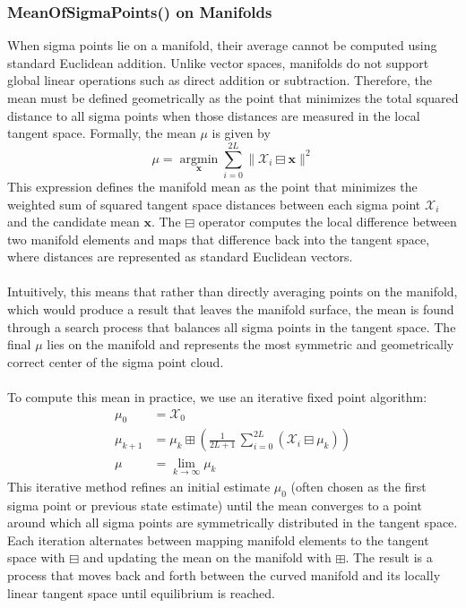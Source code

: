\subsubsection{MeanOfSigmaPoints() on Manifolds}
When sigma points lie on a manifold, their average cannot be computed using standard Euclidean addition. Unlike vector spaces, manifolds do not support global linear operations such as direct addition or subtraction. Therefore, the mean must be defined geometrically as the point that minimizes the total squared distance to all sigma points when those distances are measured in the local tangent space. Formally, the mean $\mu$ is given by
$$
    \mu = \operatorname*{argmin}_{\mathbf{x}} 
    \sum_{i=0}^{2L} \| \mathcal{X}_i \boxminus \mathbf{x} \|^2
$$
This expression defines the manifold mean as the point that minimizes the weighted sum of squared tangent space distances between each sigma point $\mathcal{X}_i$ and the candidate mean $\mathbf{x}$. The $\boxminus$ operator computes the local difference between two manifold elements and maps that difference back into the tangent space, where distances are represented as standard Euclidean vectors.  
\\ \\
Intuitively, this means that rather than directly averaging points on the manifold, which would produce a result that leaves the manifold surface, the mean is found through a search process that balances all sigma points in the tangent space. The final $\mu$ lies on the manifold and represents the most symmetric and geometrically correct center of the sigma point cloud.  
\\ \\
To compute this mean in practice, we use an iterative fixed point algorithm:
\begin{equation}
    \begin{aligned}
        \mu_0 &= \mathcal{X}_0 \\
        \mu_{k+1} &= \mu_k \boxplus 
        \left( 
            \frac{1}{2L + 1} \, \sum_{i=0}^{2L} (\mathcal{X}_i \boxminus \mu_k)
        \right) \\
        \mu &= \lim_{k \to \infty} \mu_k
    \end{aligned}
\end{equation}
This iterative method refines an initial estimate $\mu_0$ (often chosen as the first sigma point or previous state estimate) until the mean converges to a point around which all sigma points are symmetrically distributed in the tangent space. Each iteration alternates between mapping manifold elements to the tangent space with $\boxminus$ and updating the mean on the manifold with $\boxplus$. The result is a process that moves back and forth between the curved manifold and its locally linear tangent space until equilibrium is reached.  
